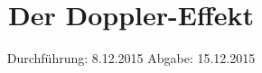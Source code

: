 

\subject{VERSUCH NUMMER 104}
\title{Der Doppler-Effekt}
\date{
  Durchführung: 8.12.2015
  \hspace{3em}
  Abgabe: 15.12.2015
}



\maketitle
\thispagestyle{empty}
\tableofcontents
\newpage








\printbibliography


